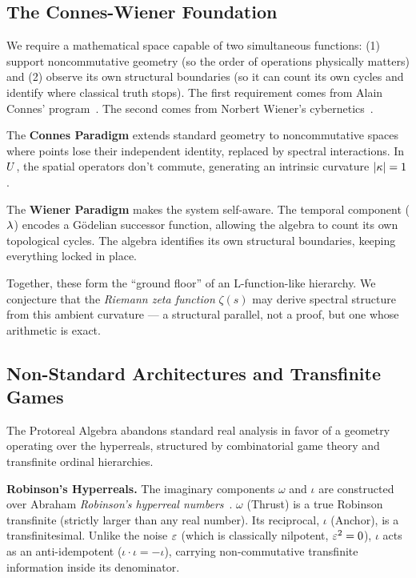\subsection{The Connes-Wiener Foundation}\label{sec:connes-wiener}

We require a mathematical space capable of two simultaneous functions: (1) support noncommutative geometry (so the order of operations physically matters) and (2) observe its own structural boundaries (so it can count its own cycles and identify where classical truth stops). The first requirement comes from Alain Connes' program~\cite{connes}. The second comes from Norbert Wiener's cybernetics~\cite{wiener}.

The \textbf{Connes Paradigm} extends standard geometry to noncommutative spaces where points lose their independent identity, replaced by spectral interactions. In $U$, the spatial operators don't commute, generating an intrinsic curvature $|\kappa| = 1$.

The \textbf{Wiener Paradigm} makes the system self-aware. The temporal component ($\lambda$) encodes a G\"odelian successor function, allowing the algebra to count its own topological cycles. The algebra identifies its own structural boundaries, keeping everything locked in place.

Together, these form the ``ground floor'' of an L-function-like hierarchy. We conjecture that the \emph{Riemann zeta function} $\zeta(s)$ may derive spectral structure from this ambient curvature --- a structural parallel, not a proof, but one whose arithmetic is exact.

\subsection{Non-Standard Architectures and Transfinite Games}

The Protoreal Algebra abandons standard real analysis in favor of a geometry operating over the hyperreals, structured by combinatorial game theory and transfinite ordinal hierarchies.

\textbf{Robinson's Hyperreals.} The imaginary components $\omega$ and $\iota$ are constructed over Abraham \emph{Robinson's hyperreal numbers}~\cite{robinson}. $\omega$ (Thrust) is a true Robinson transfinite (strictly larger than any real number). Its reciprocal, $\iota$ (Anchor), is a transfinitesimal. Unlike the noise $\varepsilon$ (which is classically nilpotent, $\varepsilon^2 = 0$), $\iota$ acts as an anti-idempotent ($\iota \cdot \iota = -\iota$), carrying non-commutative transfinite information inside its denominator.

